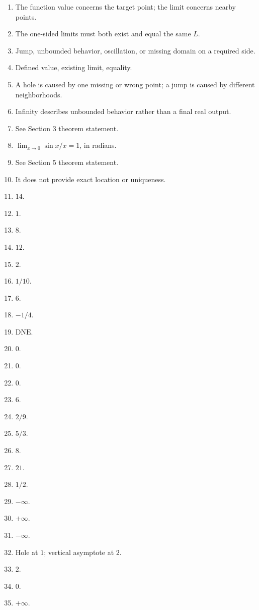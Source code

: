 \documentclass[11pt,openany]{book}
\theoremstyle{bgplain}
\newcommand{\DNE}{\mathrm{DNE}}
\begin{document}
\begin{enumerate}[label=\textbf{R\arabic*.}]
  \item The function value concerns the target point; the limit concerns nearby points.
  \item The one-sided limits must both exist and equal the same \(L\).
  \item Jump, unbounded behavior, oscillation, or missing domain on a required side.
  \item Defined value, existing limit, equality.
  \item A hole is caused by one missing or wrong point; a jump is caused by different neighborhoods.
  \item Infinity describes unbounded behavior rather than a final real output.
  \item See Section 3 theorem statement.
  \item \(\lim_{x\to0}\sin x/x=1\), in radians.
  \item See Section 5 theorem statement.
  \item It does not provide exact location or uniqueness.
  \item \(14\).
  \item \(1\).
  \item \(8\).
  \item \(12\).
  \item \(2\).
  \item \(1/10\).
  \item \(6\).
  \item \(-1/4\).
  \item \(\DNE\).
  \item \(0\).
  \item \(0\).
  \item \(0\).
  \item \(6\).
  \item \(2/9\).
  \item \(5/3\).
  \item \(8\).
  \item \(21\).
  \item \(1/2\).
  \item \(-\infty\).
  \item \(+\infty\).
  \item \(-\infty\).
  \item Hole at \(1\); vertical asymptote at \(2\).
  \item \(2\).
  \item \(0\).
  \item \(+\infty\).

\end{enumerate}
\end{document}
